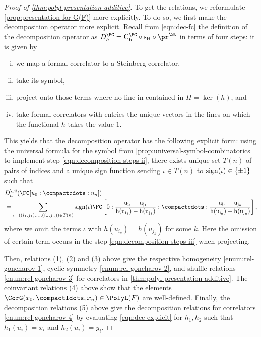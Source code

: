 \documentclass[a4paper]{amsart}
\begin{document}
\begin{proof}[Proof of \cref{thm:polyl-presentation-additive}]
To get the relations, we reformulate \cref{prop:presentation for G(F)} more explicitly. To do so, we first make the decomposition operator more explicit. Recall from \eqref{eqn:dec-fc} the definition of the decomposition operator as $D^\FC_h = \rm{C}^\FC_h \circ s_H \circ \pr^\St$ in terms of four steps: it is given by 
\begin{enumerate}[(i)]
\item \label{eqn:decomposition-steps-i} we map a formal correlator to a Steinberg correlator, 
\item \label{eqn:decomposition-steps-ii} take its symbol,
\item \label{eqn:decomposition-steps-iii} project onto those terms where no line in contained in $H = \ker(h)$, and 
\item \label{eqn:decomposition-steps-iv} take formal correlators with entries the unique vectors in the lines on which the functional $h$ takes the value $1$.
\end{enumerate} This yields that the decomposition operator has the following explicit form: using the universal formula for the symbol from \cref{prop:universal-symbol-combinatorics} to implement step \cref{eqn:decomposition-steps-ii}, there exists unique set $T(n)$ of pairs of indices and a unique sign function sending $\iota \in T(n)$ to $\rm{sign}(\iota)\in\{\pm 1\}$ such that
\begin{equation}\label{eqn:dec-explicit}\begin{aligned}
&D^\FC_h(\FC[u_0:\compactcdots:u_n])\\
&=\sum_{\iota=((i_1,j_1),\dots,(i_{n},j_n))\in T(n)}\rm{sign}(\iota)
\FC\left[0:\frac{u_{i_1}-u_{j_1}}{h(u_{i_1})-h(u_{j_1})}:\compactcdots:\frac{u_{i_n}-u_{j_n}}{h(u_{i_n})-h(u_{j_n})}\right],
\end{aligned}\end{equation}
where we omit the terms $\iota$ with $h(u_{i_k})=h(u_{j_k})$ for some $k$. Here the omission of certain term occurs in the step \eqref{eqn:decomposition-steps-iii} when projecting.

Then, relations (1), (2) and (3) above give the respective homogeneity \eqref{enum:rel-goncharov-1}, cyclic symmetry \eqref{enum:rel-goncharov-2}, and shuffle relations \eqref{enum:rel-goncharov-3} for correlators in \cref{thm:polyl-presentation-additive}. The coinvariant relations (4) above show that the elements $\CorG(x_0,\compactldots,x_n) \in \PolyL(F)$ are well-defined. Finally, the decomposition relations (5) above give the decomposition relations for correlators \eqref{enum:rel-goncharov-4} by evaluating \eqref{eqn:dec-explicit} for $h_1, h_2$ such that $h_1(u_i)=x_i$ and $h_2(u_i)=y_i$.\end{proof}
\end{document}
